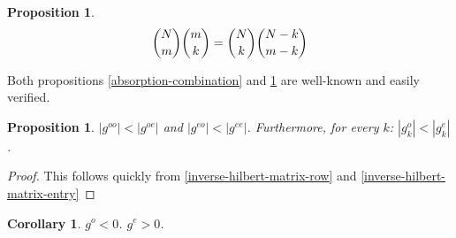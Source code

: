 \documentclass[11pt]{article}
\newtheorem{cor}[thm]{Corollary}
\newtheorem{prop}[thm]{Proposition}
\theoremstyle{definition}
\theoremstyle{remark}
\numberwithin{equation}{section}
\begin{document}
\begin{prop}\label{subset-of-a-subset-combination}
\[ \dbinom{N}{m} \dbinom{m}{k} = \dbinom{N}{k} \dbinom{N-k}{m-k} \]
\end{prop} 
\bigskip

Both propositions \ref{absorption-combination} and \ref{subset-of-a-subset-combination} are well-known and easily verified. \\

\begin{prop}
$|g^{oo}| < |g^{oe}|$ and $|g^{eo}| < |g^{ee}|$. Furthermore, for every $k$: $|g_k^o| < |g_k^e|$.
\end{prop}
\begin{proof}
This follows quickly from \ref{inverse-hilbert-matrix-row} and \ref{inverse-hilbert-matrix-entry}
\end{proof}

\begin{cor}
$g^o < 0$.
$g^e > 0$.
\end{cor}
\end{document}
